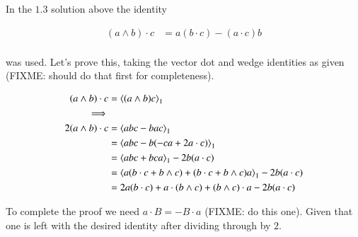 \documentclass{article}
\begin{document}
In the $1.3$ solution above the identity

\begin{align}
(a \wedge b) \cdot c &= a (b \cdot c) - (a \cdot c) b \\
\end{align}

was used.  Let's prove this, taking the vector dot and wedge identities
as given (FIXME: should do that first for completeness).

\begin{align*}
(a \wedge b) \cdot c
&= {\left\langle{{(a \wedge b) c}}\right\rangle}_{1} \\
\implies \\
2 (a \wedge b) \cdot c
&= {\left\langle{{a b c - b a c}}\right\rangle}_{1} \\
&= {\left\langle{{a b c - b (- c a + 2 a \cdot c )}}\right\rangle}_{1} \\
&= {\left\langle{{a b c + b c a}}\right\rangle}_{1} - 2 b (a \cdot c ) \\
&= {\left\langle{{a (b \cdot c + b \wedge c) + (b \cdot c + b \wedge c) a}}\right\rangle}_{1} - 2 b (a \cdot c ) \\
&= 2 a (b \cdot c) + a \cdot (b \wedge c) + (b \wedge c) \cdot a - 2 b (a \cdot c ) \\
\end{align*}

To complete the proof we need $a \cdot B = -B \cdot a$ (FIXME: do this one).  Given that one is left with the desired identity after dividing through
by $2$.



\end{document}
